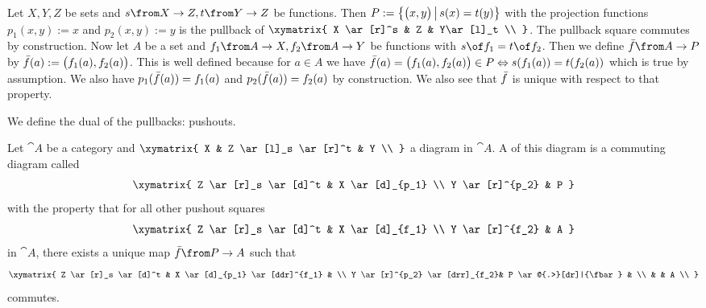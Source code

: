 \begin{example}
  \label{ex:pullback:set}
  Let $X, Y, Z$ be sets and $s \from X \to Z, t \from Y \to Z$ be functions.
  Then $P := \bigl \{ \bigl( x , y \bigr) \,\big|\, s(x) = t(y) \bigr \}$ with the projection functions
  $p_1(x,y) := x$ and $p_2(x, y) := y$ is the pullback of
  $ \xymatrix{
    X \ar[r]^s & Z & Y\ar[l]_t \\
  } $.
  The pullback square commutes by construction.
  Now let $A$ be a set and $f_1 \from A \to X, f_2 \from A \to Y$ be functions with $s \of f_1 = t \of f_2$.
  Then we define $\fbar \from A \to P$ by
  $\bar{f}(a) := \bigl( f_1(a) , f_2(a) \bigr)$.
  This is well defined because for $a \in A$ we have $\bar{f}(a) = \bigl( f_1(a) , f_2(a) \bigr) \in P \Leftrightarrow s(f_1(a)) = t(f_2(a))$ which is true by assumption.
  We also have $p_1(\bar{f}(a)) = f_1(a)$ and $p_2(\bar{f}(a)) = f_2(a)$ by construction.
  We also see that $\bar{f}$ is unique with respect to that property.
\end{example}

We define the dual of the pullbacks: pushouts.

\begin{definition}[Pushout]
  \label{def:pushout}
  Let $\cat{A}$ be a category and
  $ \xymatrix{
    X & Z \ar[l]_s \ar[r]^t & Y \\
  } $
  a diagram in $\cat{A}$.
  A  of this diagram is a commuting diagram called  \\
  \[ \xymatrix{
    Z \ar[r]_s \ar[d]^t & X \ar[d]_{p_1} \\
    Y \ar[r]^{p_2} & P
  } \]
  with the property that for all other pushout squares
  \[ \xymatrix{
    Z \ar[r]_s \ar[d]^t & X \ar[d]_{f_1} \\
    Y \ar[r]^{f_2} & A
  } \]
  in $\cat{A}$, there exists a unique map $\fbar\from P \to A$ such that
  \[ \xymatrix{
    Z \ar[r]_s \ar[d]^t & X \ar[d]_{p_1} \ar[ddr]^{f_1} & \\
    Y \ar[r]^{p_2} \ar[drr]_{f_2}& P \ar@{.>}[dr]|{\fbar} & \\
    & & A  \\
  } \]
  commutes.
\end{definition}


